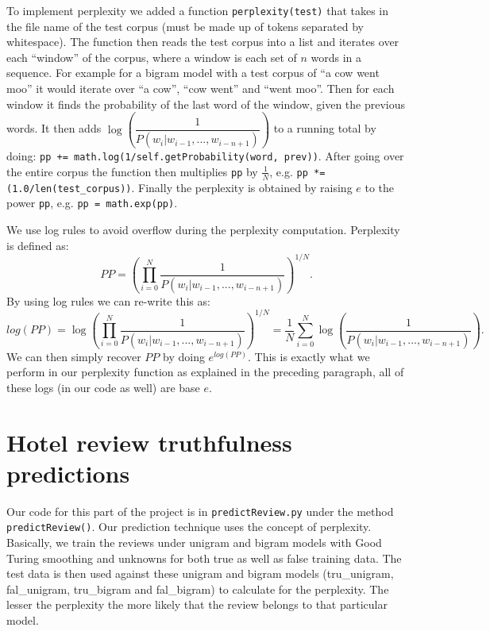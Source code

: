 \documentclass{article}
\begin{document}
To implement perplexity we added a function \texttt{perplexity(test)} that takes in the file name of the test corpus (must be made up of tokens separated by whitespace). The function then reads the test corpus into a list and iterates over each ``window'' of the corpus, where a window is each set of $n$ words in a sequence. For example for a bigram model with a test corpus of ``a cow went moo'' it would iterate over ``a cow'', ``cow went'' and ``went moo''. Then for each window it finds the probability of the last word of the window, given the previous words. It then adds $\log\left(\dfrac{1}{P(w_i|w_{i-1},...,w_{i-n+1})}\right)$ to a running total by doing: \texttt{pp += math.log(1/self.getProbability(word, prev))}. After going over the entire corpus the function then multiplies \texttt{pp} by $\frac{1}{N}$, e.g. \texttt{pp *= (1.0/len(test\_corpus))}. Finally the perplexity is obtained by raising $e$ to the power \texttt{pp}, e.g. \texttt{pp = math.exp(pp)}.

We use log rules to avoid overflow during the perplexity computation.
Perplexity is defined as:
\[PP=\left(\prod_{i=0}^N\frac{1}{P(w_i|w_{i-1},...,w_{i-n+1})}\right)^{1/N}.\]
By using log rules we can re-write this as:
\[log(PP) = \log\left(\prod_{i=0}^N\frac{1}{P(w_i|w_{i-1},...,w_{i-n+1})}\right)^{1/N} = \frac{1}{N}\sum_{i=0}^N \log\left(\frac{1}{P(w_i|w_{i-1},...,w_{i-n+1})}\right).\] We can then simply recover $PP$ by doing $e^{log(PP)}$. This is exactly what we perform in our perplexity function as explained in the preceding paragraph, all of these logs (in our code as well) are base $e$.

\section{Hotel review truthfulness predictions} %
Our code for this part of the project is in \texttt{predictReview.py} under the method \texttt{predictReview()}. Our prediction technique uses the concept of perplexity. Basically, we train the reviews under unigram and bigram models with Good Turing smoothing and unknowns for both true as well as false training data. The test data is then used against these unigram and bigram models (tru\_unigram, fal\_unigram, tru\_bigram and fal\_bigram) to calculate for the perplexity. The lesser the perplexity the more likely that the review belongs to that particular model.\par
\end{document}
